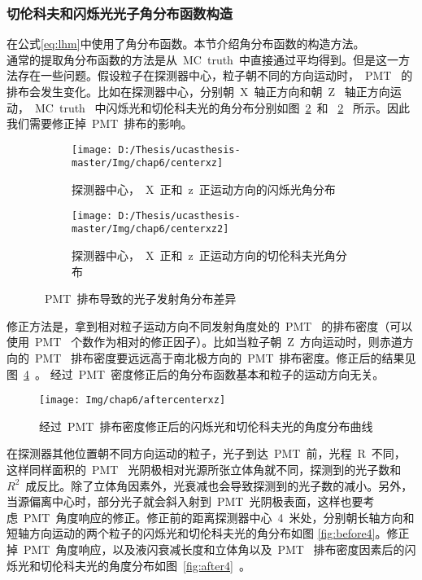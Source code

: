 \subsubsection{切伦科夫和闪烁光光子角分布函数构造}
在公式\ref{eq:lhm}中使用了角分布函数。本节介绍角分布函数的构造方法。\\
通常的提取角分布函数的方法是从~MC~truth~中直接通过平均得到。但是这一方法存在一些问题。假设粒子在探测器中心，粒子朝不同的方向运动时，~PMT~ 的排布会发生变化。比如在探测器中心，分别朝~X~轴正方向和朝~Z~ 轴正方向运动，~MC~truth~ 中闪烁光和切伦科夫光的角分布分别如图~\ref{fig:centerxz_2}~和~
\ref{fig:centerxz_2}~ 所示。因此我们需要修正掉~PMT~排布的影响。
\begin{figure}[!htb]
  \centering
  \begin{subfigure}[b]{\MySubFactor\textwidth}
    \texttt{[image: D:/Thesis/ucasthesis-master/Img/chap6/centerxz]}
    \caption{探测器中心，~X~正和~z~正运动方向的闪烁光角分布}
    \label{fig:centerxz_1}
  \end{subfigure}%
  \quad\quad\quad\quad\quad\quad%
  \begin{subfigure}[b]{\MySubFactor\textwidth}
    \texttt{[image: D:/Thesis/ucasthesis-master/Img/chap6/centerxz2]}
    \caption{探测器中心，~X~正和~z~正运动方向的切伦科夫光角分布}
    \label{fig:centerxz_2}
  \end{subfigure}
  \caption{~PMT~排布导致的光子发射角分布差异}
  \label{fig:centerxz}
\end{figure}
修正方法是，拿到相对粒子运动方向不同发射角度处的~PMT~ 的排布密度（可以使用~PMT~ 个数作为相对的修正因子）。比如当粒子朝~Z~方向运动时，则赤道方向的~PMT~ 排布密度要远远高于南北极方向的~PMT~排布密度。修正后的结果见图~\ref{fig:aftercenterxz}~。 经过~PMT~密度修正后的角分布函数基本和粒子的运动方向无关。\\
\begin{figure}[!htb]
  \centering
   \texttt{[image: Img/chap6/aftercenterxz]}
    \caption{经过~PMT~排布密度修正后的闪烁光和切伦科夫光的角度分布曲线}
  \label{fig:aftercenterxz}
\end{figure}
在探测器其他位置朝不同方向运动的粒子，光子到达~PMT~前，光程~R~不同，这样同样面积的~PMT~ 光阴极相对光源所张立体角就不同，探测到的光子数和~$R^2$~成反比。除了立体角因素外，光衰减也会导致探测到的光子数的减小。另外，当源偏离中心时，部分光子就会斜入射到~PMT~光阴极表面，这样也要考虑~PMT~角度响应的修正。修正前的距离探测器中心~4~米处，分别朝长轴方向和短轴方向运动的两个粒子的闪烁光和切伦科夫光的角分布如图
\ref{fig:before4}。修正掉~PMT~角度响应，以及液闪衰减长度和立体角以及~PMT~ 排布密度因素后的闪烁光和切伦科夫光的角度分布如图~\ref{fig:after4}~。

